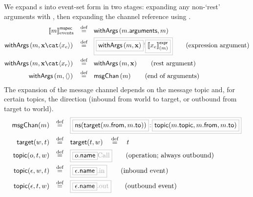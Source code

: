 \begin{defn}

We expand \mmessagespec s into event-set form in two stages: expanding
any non-`rest' arguments with , then expanding the channel
reference using .
%
\begin{align*}
	\emspecsema{\amspec}
\quad\defeq\quad&
\funcname{withArgs}\left(\field{\amspec}{arguments}, \amspec\right)
\\
	\funcname{withArgs}\left(\amspec, \anarglist\cat\langle\anexprarg\rangle\right)
\quad\defeq\quad&
\tlang{
	\olang{\funcname{withArgs}\left(\amspec, \anarglist\right)}
	!\olang{\exprsema{\anexprarg}{\amspec}}
}
\tag{expression argument}
\\
	\funcname{withArgs}\left(\amspec, \anarglist\cat\langle\arestarg\rangle\right)
\quad\defeq\quad&
	\funcname{withArgs}\left(\amspec, \anarglist\right)
\tag{rest argument}
\\
	\funcname{withArgs}\left(\amspec, \langle\rangle\right)
\quad\defeq\quad&
	\funcname{msgChan}\left(\amspec\right)
\tag{end of arguments}
\end{align*}
The expansion of the message channel
depends on the message topic
and, for certain topics, the direction (inbound from world to target, or
outbound from target to world).
\newcommand{\nsOf}[1]{\mathsf{ns}(#1)}
\newcommand{\targetOf}[2]{\mathsf{target}(#1,#2)}
\newcommand{\topicOf}[3]{\mathsf{topic}(#1,#2,#3)}
%
\begin{align*}
	\funcname{msgChan}(\amspec)
\quad\defeq\quad&
\tlang{
	\olang{\nsOf{\targetOf{\field{\amspec}{from}}{\field{\amspec}{to}}}}
	{}\cspnsop{}
	\olang{\topicOf{\field{\amspec}{topic}}{\field{\amspec}{from}}{\field{\amspec}{to}}}
}
\\
	\targetOf{\aworld}{\atarget}
\quad\defeq\quad&
	\targetOf{\atarget}{\aworld}
	\quad\defeq\quad
	\atarget
\\
	\topicOf{\anop}{\atarget}{\aworld}
\quad\defeq\quad&
\tlang{
	\olang{\field{\anop}{name}}\text{Call}
}
\tag{operation; always outbound}
\\
	\topicOf{\anevent}{\aworld}{\atarget}
\quad\defeq\quad&
	\tlang{\olang{\field{\anevent}{name}}\text{.in}}
\tag{inbound event}
\\
	\topicOf{\anevent}{\atarget}{\aworld}
\quad\defeq\quad&
	\tlang{\olang{\field{\anevent}{name}}\text{.out}}
\tag{outbound event}
\end{align*}
\end{defn}

